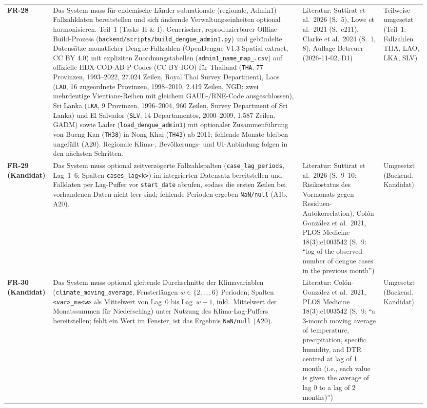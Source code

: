 \documentclass[11pt,a4paper]{article}
\begin{document}
\begin{longtable}{@{}>{\bfseries}p{1.6cm} L{7.4cm} L{3.6cm} L{2.4cm}@{}}
FR-28 & Das System muss f\"ur endemische L\"ander subnationale (regionale, Admin1) Fallzahldaten bereitstellen und sich \"andernde Verwaltungseinheiten optional harmonisieren. Teil~1 (Tasks~H \& I): Generischer, reproduzierbarer Offline-Build-Prozess (\texttt{backend/scripts/build\_dengue\_admin1.py}) und geb\"undelte Datens\"atze monatlicher Dengue-Fallzahlen (OpenDengue V1.3 Spatial extract, CC BY 4.0) mit expliziten Zuordnungstabellen (\texttt{admin1\_name\_map\_<ISO3>.csv}) auf offizielle HDX-COD-AB-P-Codes (CC BY-IGO) f\"ur Thailand (\texttt{THA}, 77 Provinzen, 1993--2022, 27.024 Zeilen, Royal Thai Survey Department), Laos (\texttt{LAO}, 16 zugeordnete Provinzen, 1998--2010, 2.419 Zeilen, NGD; zwei mehrdeutige Vientiane-Reihen mit gleichem GAUL-/RNE-Code ausgeschlossen), Sri Lanka (\texttt{LKA}, 9 Provinzen, 1996--2004, 960 Zeilen, Survey Department of Sri Lanka) und El Salvador (\texttt{SLV}, 14 Departamentos, 2000--2009, 1.587 Zeilen, GADM) sowie Lader (\texttt{load\_dengue\_admin1}) mit optionaler Zusammenf\"uhrung von Bueng Kan (\texttt{TH38}) in Nong Khai (\texttt{TH43}) ab 2011; fehlende Monate bleiben ungef\"ullt (A20). Regionale Klima-, Bev\"olkerungs- und UI-Anbindung folgen in den n\"achsten Schritten. & Literatur: Suttirat et al.\ 2026 (S.~5), Lowe et al.\ 2021 (S.~e211), Clarke et al.\ 2024 (S.~1, 8); Auflage Betreuer (2026-11-02, D1) & Teilweise umgesetzt (Teil~1: Fallzahlen THA, LAO, LKA, SLV) \\
FR-29 (Kandidat) & Das System muss optional zeitverz\"ogerte Fallzahlspalten (\texttt{case\_lag\_periods}, Lag~1--6; Spalten \texttt{cases\_lag<k>}) im integrierten Datensatz bereitstellen und Falldaten per Lag-Puffer vor \texttt{start\_date} abrufen, sodass die ersten Zeilen bei vorhandenen Daten nicht leer sind; fehlende Perioden ergeben \texttt{NaN/null} (A1b, A20). & Literatur: Suttirat et al.\ 2026 (S.~9--10: Risikostatus des Vormonats gegen Residuen-Autokorrelation), Col\'on-Gonz\'alez et al.\ 2021, PLOS Medicine 18(3):e1003542 (S.~9: ``log of the observed number of dengue cases in the previous month'') & Umgesetzt (Backend, Kandidat) \\
FR-30 (Kandidat) & Das System muss optional gleitende Durchschnitte der Klimavariablen (\texttt{climate\_moving\_average}, Fensterl\"angen $w \in \{2,\dots,6\}$ Perioden; Spalten \texttt{<var>\_ma<w>} als Mittelwert von Lag~0 bis Lag~$w-1$, inkl.\ Mittelwert der Monatssummen f\"ur Niederschlag) unter Nutzung des Klima-Lag-Puffers bereitstellen; fehlt ein Wert im Fenster, ist das Ergebnis \texttt{NaN/null} (A20). & Literatur: Col\'on-Gonz\'alez et al.\ 2021, PLOS Medicine 18(3):e1003542 (S.~9: ``a 3-month moving average of temperature, precipitation, specific humidity, and DTR centred at lag of 1 month (i.e., each value is given the average of lag 0 to a lag of 2 months)'') & Umgesetzt (Backend, Kandidat) \\
\bottomrule
\end{longtable}
\end{document}
